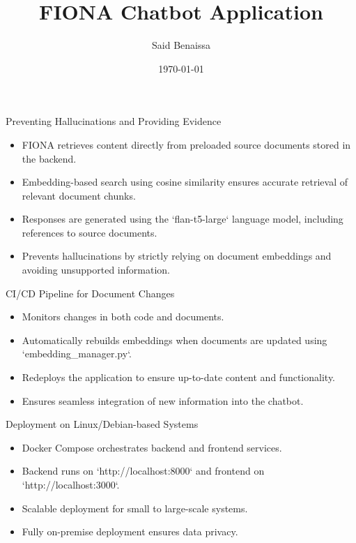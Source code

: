 \documentclass{beamer}
\title{FIONA Chatbot Application}
\author{Said Benaissa}
\date{\today}
\begin{document}
\frame{\titlepage}

\begin{frame}{Preventing Hallucinations and Providing Evidence}
    \begin{itemize}
        \item FIONA retrieves content directly from preloaded source documents stored in the backend.
        \item Embedding-based search using cosine similarity ensures accurate retrieval of relevant document chunks.
        \item Responses are generated using the `flan-t5-large` language model, including references to source documents.
        \item Prevents hallucinations by strictly relying on document embeddings and avoiding unsupported information.
    \end{itemize}
\end{frame}

\begin{frame}{CI/CD Pipeline for Document Changes}
    \begin{itemize}
        \item Monitors changes in both code and documents.
        \item Automatically rebuilds embeddings when documents are updated using `embedding_manager.py`.
        \item Redeploys the application to ensure up-to-date content and functionality.
        \item Ensures seamless integration of new information into the chatbot.
    \end{itemize}
\end{frame}

\begin{frame}{Deployment on Linux/Debian-based Systems}
    \begin{itemize}
        \item Docker Compose orchestrates backend and frontend services.
        \item Backend runs on `http://localhost:8000` and frontend on `http://localhost:3000`.
        \item Scalable deployment for small to large-scale systems.
        \item Fully on-premise deployment ensures data privacy.
    \end{itemize}
\end{frame}
\end{document}
